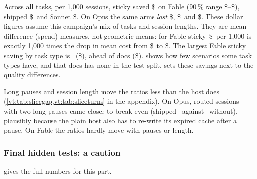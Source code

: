 \begin{table}[tbp]
\centering\small
\caption{Measured saving per 1,000 sessions (US dollars) by task type, host and arm, all splits. Ranges are in
\cref{tab:per1000full}.}
\label{vt:tab:per1000}

\end{table}

Across all tasks, per 1,000 sessions, sticky saved \$\SavFableSticky\ on Fable (90\,\% range
\$\SavFableStickyLo--\$\SavFableStickyHi), shipped \$\SavFableShipped\ and Sonnet \$\SavFableSonnet. On Opus
the same arms \emph{lost} \$\SavOpusSticky, \$\SavOpusShipped\ and \$\SavOpusSonnet. These dollar figures
assume this campaign's mix of tasks and session lengths. They are mean-difference (spend) measures, not
geometric means: for Fable sticky, \$\SavFableSticky\ per 1,000 is exactly 1,000 times the drop in mean cost from
\$\RvSpendAnchor\ to \$\RvSpendSticky. The largest Fable sticky saving by task type is \RvBestTaskFableSticky\
(\$\RvSavReviewFableSticky), ahead of docs (\$\RvSavDocsFableSticky).  shows how few
scenarios some task types have, and that docs has none in the test split. \Cref{vt:tab:jointtask} sets these savings
next to the quality differences.

\begin{table}[tbp]
\centering\small
\caption{Scenarios by task type and preregistered split. The split was stratified by family and pause pattern, not
by task type.}
\label{vt:tab:tasksplit}

\end{table}

Long pauses and session length move the ratios less than the host does (\cref{vt:tab:slicegap,vt:tab:sliceturns}
in the appendix). On Opus, routed sessions with two long pauses came closer to break-even (shipped
\GapOpusShippedYes\X\ against \GapOpusShippedNo\X\ without), plausibly because the plain host also has to
re-write its expired cache after a pause. On Fable the ratios hardly move with pauses or length.

\subsubsection{Final hidden tests: a caution}\label{vt:sec:finalpass}

 gives the full numbers for this part.

\begin{table}[tbp]
\centering\small
\caption{Final hidden-test pass rate by arm, against the plain host on the same pairs, all splits. McNemar's
test compares the scenarios only the anchor passed with those only the arm passed.}
\label{vt:tab:passrates}
{\footnotesize\setlength{\tabcolsep}{2pt}}
\end{table}

